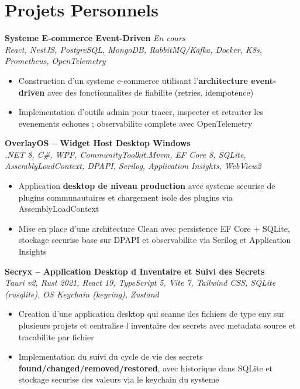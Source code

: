 \documentclass[10pt,a4paper]{article}
\begin{document}
\section*{Projets Personnels}
{\small

\textbf{Systeme E-commerce Event-Driven} \hfill \textit{En cours}\\[1pt]
\textit{React, NestJS, PostgreSQL, MongoDB, RabbitMQ/Kafka, Docker, K8s, Prometheus, OpenTelemetry}
\begin{itemize}
  \item Construction d'un systeme e-commerce utilisant l'\textbf{architecture event-driven} avec des fonctionnalites de fiabilite (retries, idempotence)
  \item Implementation d'outils admin pour tracer, inspecter et retraiter les evenements echoues ; observabilite complete avec OpenTelemetry
\end{itemize}

\vspace{3pt}
\textbf{OverlayOS -- Widget Host Desktop Windows} \\[1pt]
\textit{.NET 8, C\#, WPF, CommunityToolkit.Mvvm, EF Core 8, SQLite, AssemblyLoadContext, DPAPI, Serilog, Application Insights, WebView2}
\begin{itemize}
  \item Application \textbf{desktop de niveau production} avec systeme securise de plugins communautaires et chargement isole des plugins via AssemblyLoadContext
  \item Mise en place d'une architecture Clean avec persistence EF Core + SQLite, stockage securise base sur DPAPI et observabilite via Serilog et Application Insights
\end{itemize}

\vspace{3pt}
\textbf{Secryx -- Application Desktop d Inventaire et Suivi des Secrets} \\[1pt]
\textit{Tauri v2, Rust 2021, React 19, TypeScript 5, Vite 7, Tailwind CSS, SQLite (rusqlite), OS Keychain (keyring), Zustand}
\begin{itemize}
  \item Creation d'une application desktop qui scanne des fichiers de type env sur plusieurs projets et centralise l inventaire des secrets avec metadata source et tracabilite par fichier
  \item Implementation du suivi du cycle de vie des secrets \textbf{found/changed/removed/restored}, avec historique dans SQLite et stockage securise des valeurs via le keychain du systeme
\end{itemize}

}
\end{document}
